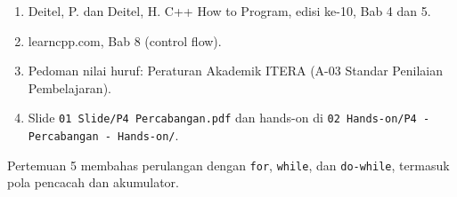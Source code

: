 \documentclass[a4paper]{article}
\begin{document}
\begin{enumerate}
\item Deitel, P. dan Deitel, H. C++ How to Program, edisi ke-10, Bab 4 dan 5.
\item learncpp.com, Bab 8 (control flow).
\item Pedoman nilai huruf: Peraturan Akademik ITERA (A-03 Standar Penilaian Pembelajaran).
\item Slide \texttt{01 Slide/P4 Percabangan.pdf} dan hands-on di \texttt{02 Hands-on/P4 - Percabangan - Hands-on/}.
\end{enumerate}
\begin{Penting}
Pertemuan 5 membahas perulangan dengan \texttt{for}, \texttt{while}, dan \texttt{do-while}, termasuk pola pencacah dan akumulator.
\end{Penting}
\end{document}
